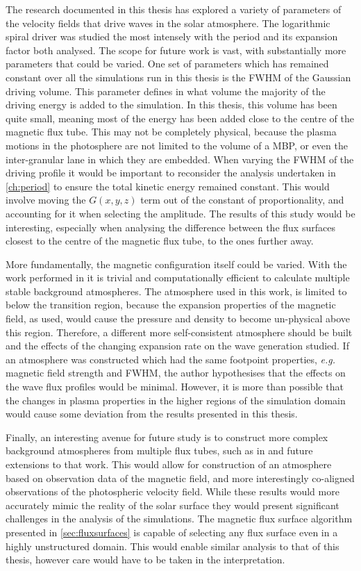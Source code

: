 The research documented in this thesis has explored a variety of parameters of the velocity fields that drive waves in the solar atmosphere.
The logarithmic spiral driver was studied the most intensely with the period and its expansion factor both analysed.
The scope for future work is vast, with substantially more parameters that could be varied.
One set of parameters which has remained constant over all the simulations run in this thesis is the FWHM of the Gaussian driving volume.
This parameter defines in what volume the majority  of the driving energy is added to the simulation.
In this thesis, this volume has been quite small, meaning most of the energy has been added close to the centre of the magnetic flux tube.
This may not be completely physical, because the plasma motions in the photosphere are not limited to the volume of a MBP, or even the inter-granular lane in which they are embedded.
When varying the FWHM of the driving profile it would be important to reconsider the analysis undertaken in \cref{ch:period} to ensure the total kinetic energy remained constant.
This would involve moving the $G(x,y,z)$ term out of the constant of proportionality, and accounting for it when selecting the amplitude.
The results of this study would be interesting, especially when analysing the difference between the flux surfaces closest to the centre of the magnetic flux tube, to the ones further away.

More fundamentally, the magnetic configuration itself could be varied.
With the work performed in \cite{gent2013,gent2014} it is trivial and computationally efficient to calculate multiple stable background atmospheres.
The atmosphere used in this work, is limited to below the transition region, because the expansion properties of the magnetic field, as used, would cause the pressure and density to become un-physical above this region.
Therefore, a different more self-consistent atmosphere should be built and the effects of the changing expansion rate on the wave generation studied.
If an atmosphere was constructed which had the same footpoint properties, \textit{e.g.} magnetic field strength and FWHM, the author hypothesises that the effects on the wave flux profiles would be minimal.
However, it is more than possible that the changes in plasma properties in the higher regions of the simulation domain would cause some deviation from the results presented in this thesis.

Finally, an interesting avenue for future study is to construct more complex background atmospheres from multiple flux tubes, such as in \cite{gent2014} and future extensions to that work.
This would allow for construction of an atmosphere based on observation data of the magnetic field, and more interestingly co-aligned observations of the photospheric velocity field.
While these results would more accurately mimic the reality of the solar surface they would present significant challenges in the analysis of the simulations.
The magnetic flux surface algorithm presented in \cref{sec:fluxsurfaces} is capable of selecting any flux surface even in a highly unstructured domain.
This would enable similar analysis to that of this thesis, however care would have to be taken in the interpretation.
